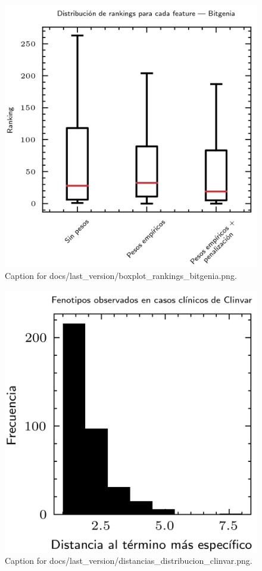 \documentclass{article}
\begin{document}
\begin{figure}[h] \centering \includegraphics{docs/last_version/boxplot_rankings_bitgenia.png} \caption{Caption for docs/last_version/boxplot_rankings_bitgenia.png.} \end{figure}
\begin{figure}[h] \centering \includegraphics{docs/last_version/distancias_distribucion_clinvar.png} \caption{Caption for docs/last_version/distancias_distribucion_clinvar.png.} \end{figure}
\end{document}
